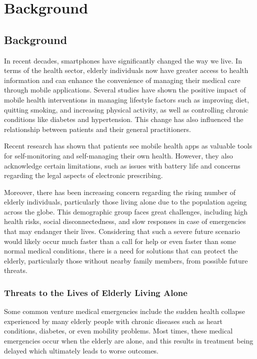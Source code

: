\documentclass{article}
\begin{document}
\section{Background}
\subsection{Background}

In recent decades, smartphones have significantly changed the way we live. In terms of the health sector, elderly individuals now have greater access to health information and can enhance the convenience of managing their medical care through mobile applications. Several studies have shown the positive impact of mobile health interventions in managing lifestyle factors such as improving diet, quitting smoking, and increasing physical activity, as well as controlling chronic conditions like diabetes and hypertension. This change has also influenced the relationship between patients and their general practitioners.

Recent research has shown that patients see mobile health apps as valuable tools for self-monitoring and self-managing their own health. However, they also acknowledge certain limitations, such as issues with battery life and concerns regarding the legal aspects of electronic prescribing.

Moreover, there has been increasing concern regarding the rising number of elderly individuals, particularly those living alone due to the population ageing across the globe. This demographic group faces great challenges, including high health risks, social disconnectedness, and slow responses in case of emergencies that may endanger their lives. Considering that such a severe future scenario would likely occur much faster than a call for help or even faster than some normal medical conditions, there is a need for solutions that can protect the elderly, particularly those without nearby family members, from possible future threats.

\subsubsection{Threats to the Lives of Elderly Living Alone}

Some common venture medical emergencies include the sudden health collapse experienced by many elderly people with chronic diseases such as heart conditions, diabetes, or even mobility problems. Most times, these medical emergencies occur when the elderly are alone, and this results in treatment being delayed which ultimately leads to worse outcomes.
\end{document}
